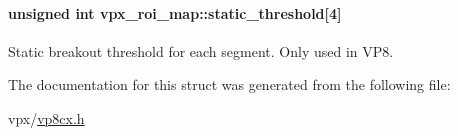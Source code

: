 \paragraph[{\texorpdfstring{static\+\_\+threshold}{static_threshold}}]{\setlength{\rightskip}{0pt plus 5cm}unsigned int vpx\+\_\+roi\+\_\+map\+::static\+\_\+threshold\mbox{[}4\mbox{]}}\hypertarget{structvpx__roi__map_a3354ff458e229361b53a0b2d1bf68cfb}{}\label{structvpx__roi__map_a3354ff458e229361b53a0b2d1bf68cfb}
Static breakout threshold for each segment. Only used in V\+P8. 

The documentation for this struct was generated from the following file\+:\begin{DoxyCompactItemize}
\item 
vpx/\hyperlink{vp8cx_8h}{vp8cx.\+h}\end{DoxyCompactItemize}
